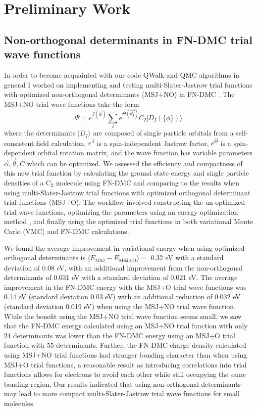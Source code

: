\documentclass[12pt]{article}
\begin{document}
\section{Preliminary Work}
\subsection{Non-orthogonal determinants in FN-DMC trial wave functions}
In order to become acquainted with our code QWalk \cite{WAGNER20093390} and QMC algorithms in general I worked on implementing and testing multi-Slater-Jastrow trial functions with optimized non-orthogonal determinants (MSJ+NO) in FN-DMC \cite{Pathak2018}.
The MSJ+NO trial wave functions take the form
\begin{equation}
\Psi=e^{J(\vec{\alpha})} \sum_I e^{\hat{\Theta}(\vec{\theta_I})} C_I |D_I (\{ \phi\})\rangle
\end{equation}
where the determinants $|D_I\rangle$ are composed of single particle orbitals from a self-consistent field calculation, $e^J$ is a spin-independent Jastrow factor, $e^{\hat{\Theta}}$ is a spin-dependent orbital rotation matrix, and the wave function has variable parameters $\vec{\alpha}, \vec{\theta}, \vec{C}$ which can be optimized.
We assessed the efficiency and compactness of this new trial function by calculating the ground state energy and single particle densities of a C$_2$ molecule using FN-DMC and comparing to the results when using multi-Slater-Jastrow trial functions with optimized orthogonal determinant trial functions (MSJ+O). 
The workflow involved constructing the un-optimized trial wave functions, optimizing the parameters using an energy optimization method \cite{Toulouse2007}, and finally using the optimized trial functions in both variational Monte Carlo (VMC) and FN-DMC calculations. 

We found the average improvement in variational energy when using optimized orthogonal determinants is $\langle E_\text{MSJ} - E_\text{MSJ+O} \rangle = $ 0.32 eV with a standard deviation of 0.08 eV, with an additional improvement from the non-orthogonal determinants of 0.031 eV with a standard deviation of 0.021 eV.
The average improvement in the FN-DMC energy with the MSJ+O trial wave functions was 0.14 eV (standard deviation 0.03 eV) with an additional reduction of 0.032 eV (standard deviation 0.019 eV) when using the MSJ+NO trial wave function.
While the benefit using the MSJ+NO trial wave function seems small, we saw that the FN-DMC energy calculated using an MSJ+NO trial function with only 24 determinants was lower than the FN-DMC energy using an MSJ+O trial function with 55 determinants.
Further, the FN-DMC charge density calculated using MSJ+NO trial functions had stronger bonding character than when using MSJ+O trial functions, a reasonable result as introducing correlations into trial functions allows for electrons to avoid each other while still occupying the same bonding region. 
Our results indicated that using non-orthogonal determinants may lead to more compact multi-Slater-Jastrow trial wave functions for small molecules.
\end{document}
